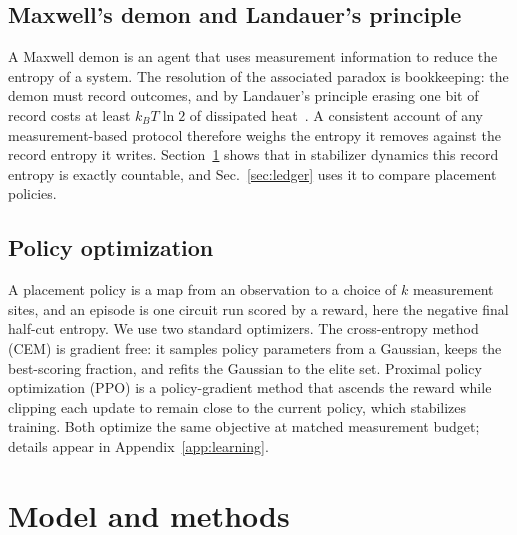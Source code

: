\documentclass[aps,prb,twocolumn,superscriptaddress,nofootinbib]{revtex4-2}
\begin{document}
\subsection{Maxwell's demon and Landauer's principle}
A Maxwell demon is an agent that uses measurement information to reduce
the entropy of a system. The resolution of the associated paradox is
bookkeeping: the demon must record outcomes, and by Landauer's principle
erasing one bit of record costs at least $k_B T \ln 2$ of dissipated
heat~\cite{Landauer1961,Bennett1982}. A consistent account of any
measurement-based protocol therefore weighs the entropy it removes
against the record entropy it writes. Section~\ref{sec:model} shows that
in stabilizer dynamics this record entropy is exactly countable, and
Sec.~\ref{sec:ledger} uses it to compare placement policies.

\subsection{Policy optimization}
A placement policy is a map from an observation to a choice of $k$
measurement sites, and an episode is one circuit run scored by a reward,
here the negative final half-cut entropy. We use two standard
optimizers. The cross-entropy method (CEM) is gradient free: it samples
policy parameters from a Gaussian, keeps the best-scoring fraction, and
refits the Gaussian to the elite set. Proximal policy optimization (PPO)
is a policy-gradient method that ascends the reward while clipping each
update to remain close to the current policy, which stabilizes training.
Both optimize the same objective at matched measurement budget; details
appear in Appendix~\ref{app:learning}.

\section{Model and methods}
\label{sec:model}
\end{document}
